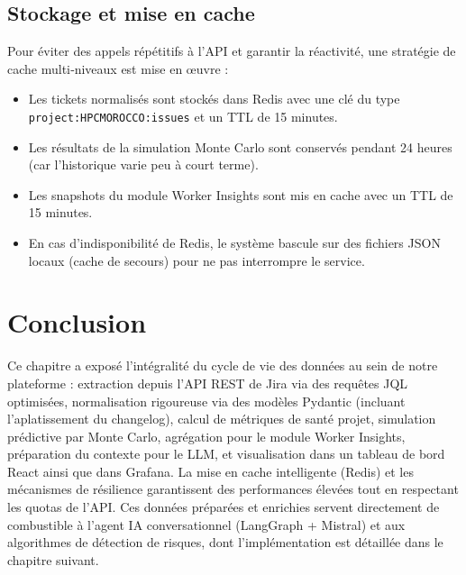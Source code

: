 \subsection{Stockage et mise en cache}
\label{subsec:stockage_cache}
Pour éviter des appels répétitifs à l’API et garantir la réactivité, une stratégie de cache multi‑niveaux est mise en œuvre :
\begin{itemize}
    \renewcommand{\labelitemi}{—}
    \item Les tickets normalisés sont stockés dans Redis avec une clé du type \texttt{project:HPCMOROCCO:issues} et un TTL de 15 minutes.
    \item Les résultats de la simulation Monte Carlo sont conservés pendant 24 heures (car l’historique varie peu à court terme).
    \item Les snapshots du module Worker Insights sont mis en cache avec un TTL de 15 minutes.
    \item En cas d’indisponibilité de Redis, le système bascule sur des fichiers JSON locaux (cache de secours) pour ne pas interrompre le service.
\end{itemize}

\section{Conclusion}
Ce chapitre a exposé l’intégralité du cycle de vie des données au sein de notre plateforme : extraction depuis l’API REST de Jira via des requêtes JQL optimisées, normalisation rigoureuse via des modèles Pydantic (incluant l’aplatissement du changelog), calcul de métriques de santé projet, simulation prédictive par Monte Carlo, agrégation pour le module Worker Insights, préparation du contexte pour le LLM, et visualisation dans un tableau de bord React ainsi que dans Grafana. La mise en cache intelligente (Redis) et les mécanismes de résilience garantissent des performances élevées tout en respectant les quotas de l’API. Ces données préparées et enrichies servent directement de combustible à l’agent IA conversationnel (LangGraph + Mistral) et aux algorithmes de détection de risques, dont l’implémentation est détaillée dans le chapitre suivant.